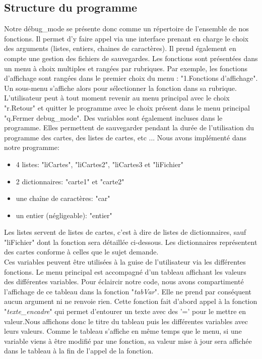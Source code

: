 \documentclass[10pt,a4paper,french,titlepage]{article}
\theoremstyle{definition}
\begin{document}
\subsection{Structure du programme}
Notre débug\_mode se présente donc comme un répertoire de l'ensemble de nos fonctions. Il permet d'y faire appel via une interface prenant en charge le choix des arguments (listes, entiers, chaines de caractères). Il prend également en compte une gestion des fichiers de sauvegardes.  Les fonctions sont présentées dans un menu à choix multiples et rangées par rubriques. Par exemple, les fonctions d'affichage sont rangées dans le premier choix du menu : "1.Fonctions d'affichage". Un sous-menu s'affiche alors pour sélectionner la fonction dans sa rubrique. L'utilisateur peut à tout moment revenir au menu principal avec le choix "r.Retour" et quitter le programme avec le choix présent dans le menu principal "q.Fermer debug\_mode". Des variables sont également incluses dans le programme. Elles permettent de sauvegarder pendant la durée de l'utilisation du programme des cartes, des listes
de cartes, etc ... Nous avons implémenté dans notre programme:\\
\begin{itemize}
\item 4 listes: "liCartes", "liCartes2", "liCartes3 et "liFichier"\\
\item 2 dictionnaires: "carte1" et "carte2"\\
\item une chaîne de caractères: "car"\\
\item un entier (négligeable): "entier"\\
\end{itemize}

Les listes servent de listes de cartes, c'est à dire de listes de dictionnaires, sauf "liFichier" dont la fonction sera détaillée ci-dessous. Les dictionnaires représentent des cartes conforme à celles que le sujet demande. \\

Ces variables peuvent être utilisées à la guise de l'utilisateur via les différentes fonctions. Le menu principal est accompagné d'un tableau affichant les valeurs des 
différentes variables. Pour éclaircir notre code, nous avons compartimenté l'affichage de ce tableau dans la fonction "\textit{tabVar}". Elle ne prend par conséquent aucun
argument ni ne renvoie rien. Cette fonction fait d'abord appel à la fonction "\textit{texte\_encadre}" qui permet d'entourer un texte avec des '=' pour le mettre en valeur.Nous affichons donc le titre du tableau puis les différentes variables avec leurs valeurs. Comme le tableau s'affiche en même temps que le menu, si une variable viens à être modifié par une fonction, sa valeur mise à jour sera affichée dans le tableau à la fin de l'appel de la fonction.
\end{document}
